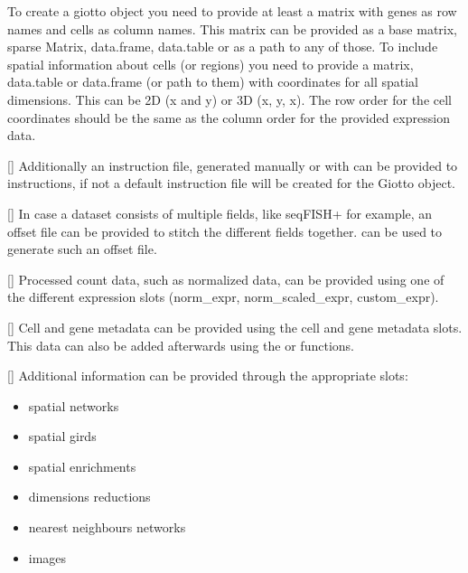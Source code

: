\documentclass[a4paper]{book}
\begin{document}
%
\begin{Details} To create a giotto object you need to provide at least a matrix with genes as
row names and cells as column names. This matrix can be provided as a base matrix, sparse Matrix, data.frame,
data.table or as a path to any of those. 
To include spatial information about cells (or regions) you need to provide a matrix, data.table or data.frame (or path to them)
with coordinates for all spatial dimensions. This can be 2D (x and y) or 3D (x, y, x).
The row order for the cell coordinates should be the same as the column order for the provided expression data.

[] Additionally an instruction file, generated manually or with 
can be provided to instructions, if not a default instruction file will be created
for the Giotto object.

[] In case a dataset consists of multiple fields, like seqFISH+ for example,
an offset file can be provided to stitch the different fields together. 
can be used to generate such an offset file.

[] Processed count data, such as normalized data, can be provided using
one of the different expression slots (norm\_expr, norm\_scaled\_expr, custom\_expr).

[] Cell and gene metadata can be provided using the cell and gene metadata slots.
This data can also be added afterwards using the  or  functions.

[] Additional information can be provided through the appropriate slots:
\begin{itemize}

\item{} spatial networks
\item{} spatial girds
\item{} spatial enrichments
\item{} dimensions reductions
\item{} nearest neighbours networks
\item{} images

\end{itemize}

\end{Details}
\end{document}
